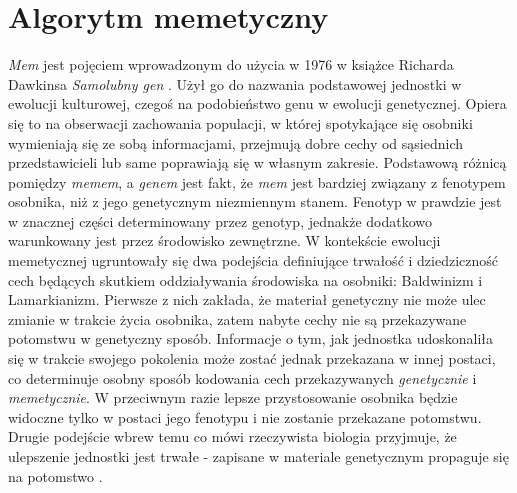 \section{Algorytm memetyczny}
%
\par
\emph{Mem} jest pojęciem wprowadzonym do użycia w 1976 w książce Richarda Dawkinsa \emph{Samolubny gen} \cite{dawkins2011}. Użył go do nazwania podstawowej jednostki w ewolucji kulturowej, czegoś na podobieństwo genu w ewolucji genetycznej. Opiera się to na obserwacji zachowania populacji, w której spotykające się osobniki wymieniają się ze sobą informacjami, przejmują dobre cechy od sąsiednich przedstawicieli lub same poprawiają się w własnym zakresie. Podstawową różnicą pomiędzy \emph{memem}, a \emph{genem} jest fakt, że \emph{mem} jest bardziej związany z fenotypem osobnika, niż z jego genetycznym niezmiennym stanem. Fenotyp w prawdzie jest w znacznej części determinowany przez genotyp, jednakże dodatkowo warunkowany jest przez środowisko zewnętrzne. W kontekście ewolucji memetycznej ugruntowały się dwa podejścia definiujące trwałość i dziedziczność cech będących skutkiem oddziaływania środowiska na osobniki: Baldwinizm i Lamarkianizm. Pierwsze z nich zakłada, że materiał genetyczny nie może ulec zmianie w trakcie życia osobnika, zatem nabyte cechy nie są przekazywane potomstwu w genetyczny sposób. Informacje o tym, jak jednostka udoskonaliła się w trakcie swojego pokolenia może zostać jednak przekazana w innej postaci, co determinuje osobny sposób kodowania cech przekazywanych \emph{genetycznie} i \emph{memetycznie}. W przeciwnym razie lepsze przystosowanie osobnika będzie widoczne tylko w postaci jego fenotypu i nie zostanie przekazane potomstwu. Drugie podejście wbrew temu co mówi rzeczywista biologia przyjmuje, że ulepszenie jednostki jest trwałe - zapisane w materiale genetycznym propaguje się na potomstwo \cite{whitley1994lamarckian}.
